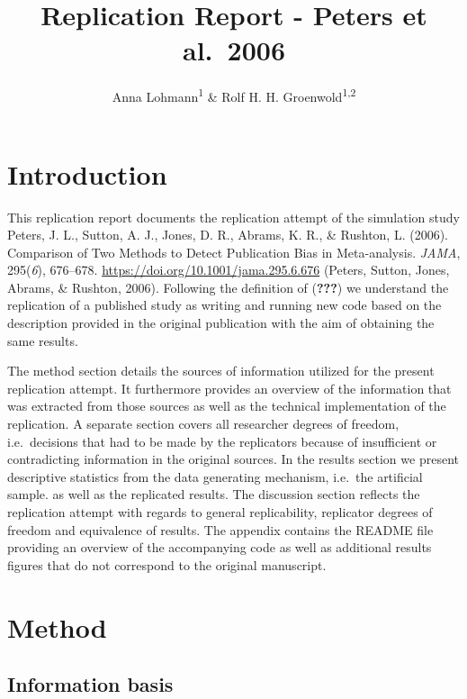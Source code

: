 \documentclass[
  english,
  doc,floatsintext,draftall]{apa6}
\title{Replication Report - Peters et al.~2006}
\author{Anna Lohmann\textsuperscript{1} \& Rolf H. H. Groenwold\textsuperscript{1,2}}
\date{}
\affiliation{\vspace{0.5cm}\textsuperscript{1,2} Leiden University Medical Center}
\begin{document}
\maketitle

\hypertarget{introduction}{%
\section{Introduction}\label{introduction}}

This replication report documents the replication attempt of the simulation study Peters, J. L., Sutton, A. J., Jones, D. R., Abrams, K. R., \& Rushton, L. (2006). Comparison of Two Methods to Detect Publication Bias in Meta-analysis. \emph{JAMA}, 295(\emph{6}), 676--678. \url{https://doi.org/10.1001/jama.295.6.676} (Peters, Sutton, Jones, Abrams, \& Rushton, 2006).
Following the definition of ({\textbf{???}}) we understand the replication of a published study as writing and running new code based on the description provided in the original publication with the aim of obtaining the same results.

The method section details the sources of information utilized for the present replication attempt. It furthermore provides an overview of the information that was extracted from those sources as well as the technical implementation of the replication.
A separate section covers all researcher degrees of freedom, i.e.~decisions that had to be made by the replicators because of insufficient or contradicting information in the original sources.
In the results section we present descriptive statistics from the data generating mechanism, i.e.~the artificial sample.
as well as the replicated results.
The discussion section reflects the replication attempt with regards to general replicability, replicator degrees of freedom and equivalence of results.
The appendix contains the README file providing an overview of the accompanying code as well as additional results figures that do not correspond to the original manuscript.

\hypertarget{method}{%
\section{Method}\label{method}}

\hypertarget{information-basis}{%
\subsection{Information basis}\label{information-basis}}
\end{document}
